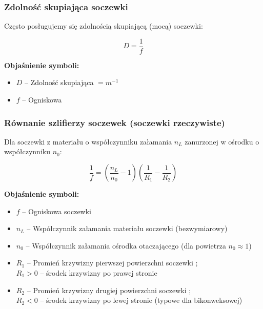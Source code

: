 \documentclass[12pt,a4paper]{article}
\newcommand{\oznaczenie}[2]{%
  \item $#1$ -- #2%
}
\begin{document}
\subsubsection{Zdolność skupiająca soczewki}

Często posługujemy się zdolnością skupiającą (mocą) soczewki:
\begin{wzorbox}
\begin{equation}
  D = \frac{1}{f}
  \label{eq:zdolnosc_skupiajaca}
\end{equation}
\end{wzorbox}

\begin{objasnbox}
\textbf{Objaśnienie symboli:}
\begin{itemize}[leftmargin=2em]
  \oznaczenie{D}{Zdolność skupiająca  $= \si{m^{-1}}$}
  \oznaczenie{f}{Ogniskowa \quad [\textbf{m}]}
\end{itemize}
\end{objasnbox}

\subsubsection{Równanie szlifierzy soczewek (soczewki rzeczywiste)}

Dla soczewki z materiału o współczynniku załamania $n_L$ zanurzonej
w ośrodku o współczynniku $n_0$:

\begin{wzorbox}
\begin{equation}
  \frac{1}{f} = \left(\frac{n_L}{n_0} - 1\right)
                \left(\frac{1}{R_1} - \frac{1}{R_2}\right)
  \label{eq:szlifierzy}
\end{equation}
\end{wzorbox}

\begin{objasnbox}
\textbf{Objaśnienie symboli:}
\begin{itemize}[leftmargin=2em]
  \oznaczenie{f}{Ogniskowa soczewki \quad [\textbf{m}]}
  \oznaczenie{n_L}{Współczynnik załamania materiału soczewki (bezwymiarowy)}
  \oznaczenie{n_0}{Współczynnik załamania ośrodka otaczającego (dla powietrza $n_0\approx1$)}
  \oznaczenie{R_1}{Promień krzywizny pierwszej powierzchni soczewki \quad [\textbf{m}];\\
               $R_1>0$ -- środek krzywizny po prawej stronie}
  \oznaczenie{R_2}{Promień krzywizny drugiej powierzchni soczewki \quad [\textbf{m}];\\
               $R_2<0$ -- środek krzywizny po lewej stronie (typowe dla bikonweksowej)}
\end{itemize}
\end{objasnbox}
\end{document}
